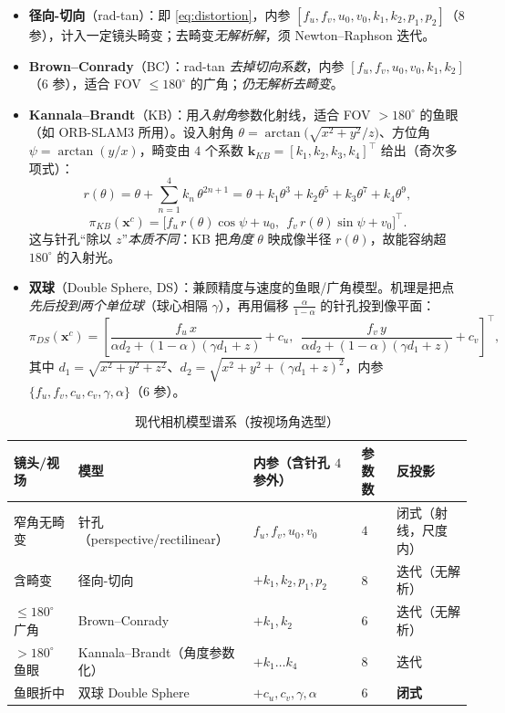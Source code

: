 \begin{itemize}
  \item \textbf{径向-切向}（rad-tan）：即 \cref{eq:distortion}，内参 $[f_u,f_v,u_0,v_0,k_1,k_2,p_1,p_2]$（$8$ 参），计入一定镜头畸变；去畸变\emph{无解析解}，须 Newton--Raphson 迭代。
  \item \textbf{Brown--Conrady}（BC）：rad-tan \emph{去掉切向系数}，内参 $[f_u,f_v,u_0,v_0,k_1,k_2]$（$6$ 参），适合 FOV $\le180^\circ$ 的广角；\emph{仍无解析去畸变}。
  \item \textbf{Kannala--Brandt}（KB）：用\emph{入射角}参数化射线，适合 FOV $>180^\circ$ 的鱼眼（如 ORB-SLAM3 所用）。设入射角 $\theta=\arctan\big(\sqrt{x^2+y^2}/z\big)$、方位角 $\psi=\arctan(y/x)$，畸变由 $4$ 个系数 $\mathbf{k}_{KB}=[k_1,k_2,k_3,k_4]^\top$ 给出（奇次多项式）：
  \begin{equation}
    r(\theta)=\theta+\sum_{n=1}^{4}k_n\,\theta^{2n+1}
    =\theta+k_1\theta^3+k_2\theta^5+k_3\theta^7+k_4\theta^9,
    \label{eq:kb}
  \end{equation}
  \begin{equation}
    \pi_{KB}(\mathbf{x}^c)=\big[f_u\,r(\theta)\cos\psi+u_0,\ \ f_v\,r(\theta)\sin\psi+v_0\big]^\top.
    \label{eq:kb-proj}
  \end{equation}
  这与针孔“除以 $z$”\emph{本质不同}：KB 把\emph{角度} $\theta$ 映成像半径 $r(\theta)$，故能容纳超 $180^\circ$ 的入射光。
  \item \textbf{双球}（Double Sphere, DS）：兼顾精度与速度的鱼眼/广角模型。机理是把点\emph{先后投到两个单位球}（球心相隔 $\gamma$），再用偏移 $\tfrac{\alpha}{1-\alpha}$ 的针孔投到像平面：
  \begin{equation}
    \pi_{DS}(\mathbf{x}^c)=\left[
    \frac{f_u\,x}{\alpha d_2+(1-\alpha)(\gamma d_1+z)}+c_u,\ \
    \frac{f_v\,y}{\alpha d_2+(1-\alpha)(\gamma d_1+z)}+c_v
    \right]^\top,
    \label{eq:ds}
  \end{equation}
  其中 $d_1=\sqrt{x^2+y^2+z^2}$、$d_2=\sqrt{x^2+y^2+(\gamma d_1+z)^2}$，内参 $\{f_u,f_v,c_u,c_v,\gamma,\alpha\}$（$6$ 参）。
\end{itemize}

\begin{table}[H]\centering\small
\caption{现代相机模型谱系（按视场角选型）}
\label{tab:lens}
\begin{tabular}{lllll}
\toprule
镜头/视场 & 模型 & 内参（含针孔 $4$ 参外） & 参数数 & 反投影 \\
\midrule
窄角无畸变 & 针孔（perspective/rectilinear） & $f_u,f_v,u_0,v_0$ & $4$ & 闭式（射线，尺度内） \\
含畸变 & 径向-切向 & $+k_1,k_2,p_1,p_2$ & $8$ & 迭代（无解析） \\
$\le180^\circ$ 广角 & Brown--Conrady & $+k_1,k_2$ & $6$ & 迭代（无解析） \\
$>180^\circ$ 鱼眼 & Kannala--Brandt（角度参数化） & $+k_1{\dots}k_4$ & $8$ & 迭代 \\
鱼眼折中 & 双球 Double Sphere & $+c_u,c_v,\gamma,\alpha$ & $6$ & \textbf{闭式} \\
\bottomrule
\end{tabular}
\end{table}

